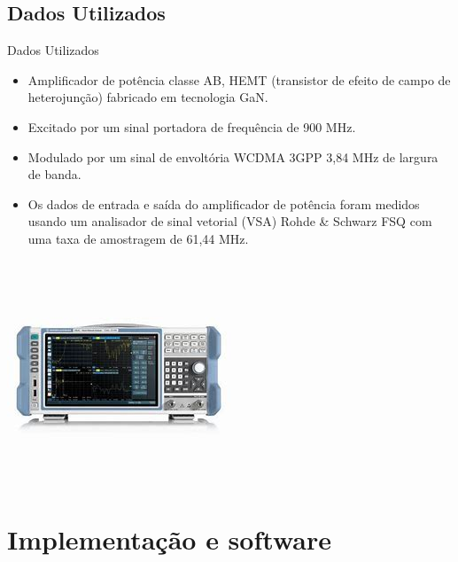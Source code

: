 \documentclass{if-beamer}
\begin{document}
\subsection{Dados Utilizados}
\begin{frame}{Dados Utilizados}
	\begin{minipage}{0.5\textwidth}
		
		
	\end{minipage}%
	\hspace{0.04\textwidth}
	\begin{minipage}{0.5\textwidth}
		\begin{itemize}
			\item Amplificador de potência classe AB, HEMT (transistor de efeito de campo de heterojunção) fabricado em tecnologia GaN.
			\item Excitado por um sinal portadora de frequência de 900	MHz.
			\item Modulado por um sinal de envoltória WCDMA 3GPP 3,84 MHz de largura de banda.
			\item Os dados de entrada e saída do amplificador de potência foram medidos usando um analisador de sinal vetorial (VSA) Rohde \& Schwarz FSQ com uma taxa de amostragem de 61,44 MHz.
		\end{itemize}
	\end{minipage}
	\begin{minipage}{0.5\textwidth}
		
		\includegraphics[scale=0.4]{analisador.jpeg}
		
	\end{minipage}%
\end{frame}

\section{Implementação e software}
\end{document}

